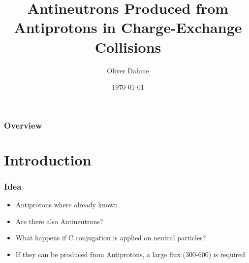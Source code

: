\documentclass{beamer}
\title[Antineutrons]{Antineutrons Produced from Antiprotons in Charge-Exchange Collisions} %
\author{Oliver Dahme} %
\institute[UZH] %
{
University of Zurich \\ %
\medskip
\textit{o.dahme@cern.ch} %
}
\date{\today} %
\begin{document}
\begin{frame}
\titlepage %
\end{frame}

\begin{frame}
\frametitle{Overview} %
\tableofcontents %
\end{frame}


\section{Introduction} %

\begin{frame}
\frametitle{Idea}
\begin{itemize}
  \item Antiprotons where already known
  \item Are there also Antineutrons?
  \item What happens if C conjugation is applied on neutral particles?
  \item If they can be produced from Antiprotons, a large flux (300-600) is required
\end{itemize}
\end{frame}
\end{document}

